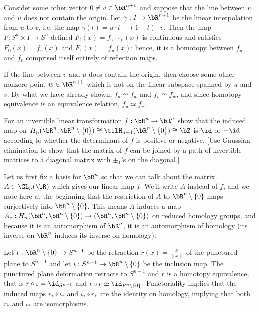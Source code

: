 \begin{homework}[e]
\begin{prf}
    Consider some other vector $0 \neq v \in \bR^{n+1}$ and suppose that the line between $v$ and $u$ does not contain the origin. Let $\gamma:I \to \bR^{n+1}$ be the linear interpolation from $u$ to $v$, i.e. the map $\gamma(t) = u\cdot t - (1 - t)\cdot v$. Then the map $F:S^n\times I \to S^n$ defined $F_t(x) = f_{\gamma(t)}(x)$ is continuous and satisfies $F_0(x) = f_v(x)$ and $F_1(x) = f_u(x)$; hence, it is a homotopy between $f_u$ and $f_v$ comprised itself entirely of reflection maps.

    If the line between $v$ and $u$ does contain the origin, then choose some other nonzero point $w \in \bR^{n+1}$ which is not on the linear subspace spanned by $u$ and $v$. By what we have already shown, $f_u \simeq f_w$ and $f_v \simeq f_w$, and since homotopy equivalence is an equivalence relation, $f_u \simeq f_v$.
  \end{prf}
   For an invertible linear transformation $f:\bR^n\to \bR^n$ show that the induced map on $H_n (\bR^n, \bR^n \setminus \{0\}) \cong \tilH_{n-1}(\bR^n \setminus \{0\}) \cong \bZ$ is $\id$ or $-\id$ according to whether the determinant of $f$ is positive or negative. [Use Gaussian elimination to show that the matrix of $f$ can be joined by a path of invertible matrices to a diagonal matrix with $\pm_1$'s on the diagonal.]
  \begin{prf}
    Let us first fix a basis for $\bR^n$ so that we can talk about the matrix $A\in \GL_n(\bR)$ which gives our linear map $f$. We'll write $A$ instead of $f$, and we note here at the beginning that the restriction of $A$ to $\bR^n\setminus \{0\}$ maps surjectively into $\bR^n \setminus \{0\}$. This means $A$ induces a map $A_*:H_n(\bR^n,\bR^n\setminus \{0\}) \to (\bR^n,\bR^n\setminus \{0\})$ on reduced homology groups, and because it is an automorphism of $\bR^n$, it is an automorphism of homology (its inverse on $\bR^n$ induces its inverse on homology). 

    Let $r:\bR^{n}\setminus \{0\}\to S^{n-1}$ be the retraction $r(x) = \frac{x}{\|x\|}$ of the punctured plane to $S^{n-1}$ and let $\iota:S^{n-1}\to \bR^{n}\setminus \{0\}$ be the inclusion map. The punctured plane deformation retracts to $S^{n-1}$ and $r$ is a homotopy equivalence, that is $r\circ \iota = \id_{S^{n-1}}$ and $\iota \circ r \simeq \id_{R^{n}\setminus \{0\}}$. Functoriality implies that the induced maps $r_*\circ \iota_*$ and $\iota_*\circ r_*$ are the identity on homology, implying that both $r_*$ and $\iota_*$ are isomorphisms.


\end{prf}
\end{homework}
